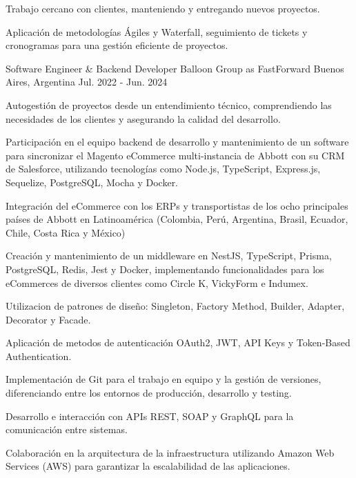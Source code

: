 \begin{cventries}
{\begin{cvitems}
        \item {Trabajo cercano con clientes, manteniendo y entregando nuevos proyectos.}
        \item {Aplicación de metodologías Ágiles y Waterfall, seguimiento de tickets y cronogramas para una gestión eficiente de proyectos.}
      \end{cvitems}
    }
  \vspace{5.5mm}
\cventry
    {Software Engineer \& Backend Developer} %
    {Balloon Group as FastForward} %
    {Buenos Aires, Argentina} %
    {Jul. 2022 - Jun. 2024} %
    {
      \begin{cvitems} %
        \item {Autogestión de proyectos desde un entendimiento técnico, comprendiendo las necesidades de los clientes y asegurando la calidad del desarrollo.}
        \item {Participación en el equipo backend de desarrollo y mantenimiento de un software para sincronizar el Magento eCommerce multi-instancia de Abbott con su CRM de Salesforce, utilizando tecnologías como Node.js, TypeScript, Express.js, Sequelize, PostgreSQL, Mocha y Docker.}
        \item {Integración del eCommerce con los ERPs y transportistas de los ocho principales países de Abbott en Latinoamérica (Colombia, Perú, Argentina, Brasil, Ecuador, Chile, Costa Rica y México)}
        \item {Creación y mantenimiento de un middleware en NestJS, TypeScript, Prisma, PostgreSQL, Redis, Jest y Docker, implementando funcionalidades para los eCommerces de diversos clientes como Circle K, VickyForm e Indumex.}
        \item {Utilizacion de patrones de diseño: Singleton, Factory Method, Builder, Adapter, Decorator y Facade.}
        \item {Aplicación de metodos de autenticación OAuth2, JWT, API Keys y Token-Based Authentication.}
        \item {Implementación de Git para el trabajo en equipo y la gestión de versiones, diferenciando entre los entornos de producción, desarrollo y testing.}
        \item {Desarrollo e interacción con APIs REST, SOAP y GraphQL para la comunicación entre sistemas.}
        \item {Colaboración en la arquitectura de la infraestructura utilizando Amazon Web Services (AWS) para garantizar la escalabilidad de las aplicaciones.}

\end{cvitems}}
\end{cventries}
